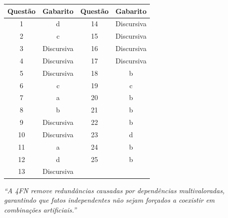 \documentclass[12pt]{article}
\begin{document}
\begin{center}
\begin{tabular}{|c|c||c|c|}
\hline
\textbf{Questão} & \textbf{Gabarito} & \textbf{Questão} & \textbf{Gabarito} \\
\hline
1  & d & 14 & Discursiva \\
2  & c & 15 & Discursiva \\
3  & Discursiva & 16 & Discursiva \\
4  & Discursiva & 17 & Discursiva \\
5  & Discursiva & 18 & b \\
6  & c & 19 & c \\
7  & a & 20 & b \\
8  & b & 21 & b \\
9  & Discursiva & 22 & b \\
10 & Discursiva & 23 & d \\
11 & a & 24 & b \\
12 & d & 25 & b \\
13 & Discursiva & & \\
\hline
\end{tabular}
\end{center}

\vspace{0.5cm}
\begin{center}
  \textit{``A 4FN remove redundâncias causadas por dependências multivaloradas, garantindo que fatos independentes não sejam forçados a coexistir em combinações artificiais.''}
\end{center}
\end{document}
